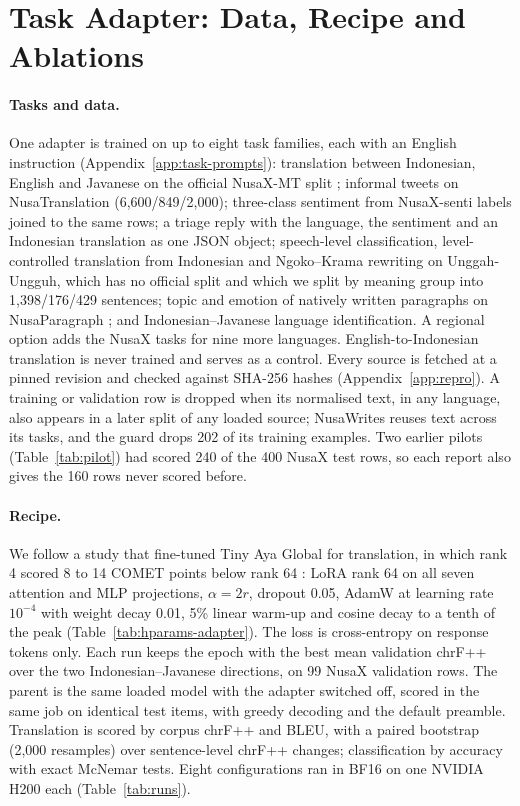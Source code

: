 \documentclass[11pt]{article}
\begin{document}
\section{Task Adapter: Data, Recipe and Ablations}\label{app:adapter}

\paragraph{Tasks and data.} One adapter is trained on up to eight task families, each with an English
instruction (Appendix~\ref{app:task-prompts}): translation between Indonesian, English and Javanese on the
official NusaX-MT split \citep[500/100/400 rows;][]{winata2023nusax}; informal tweets on NusaTranslation
(6,600/849/2,000); three-class sentiment from NusaX-senti labels joined to the same rows; a triage reply with the
language, the sentiment and an Indonesian translation as one JSON object; speech-level classification,
level-controlled translation from Indonesian and Ngoko--Krama rewriting on Unggah-Ungguh, which has no official
split and which we split by meaning group into 1,398/176/429 sentences; topic and emotion of natively written
paragraphs on NusaParagraph \citep{cahyawijaya2023nusawrites}; and Indonesian--Javanese language identification.
A regional option adds the NusaX tasks for nine more languages. English-to-Indonesian translation is never
trained and serves as a control. Every source is fetched at a pinned revision and checked against SHA-256
hashes (Appendix~\ref{app:repro}). A training or validation row is dropped when its normalised text, in any
language, also appears in a later split of any loaded source; NusaWrites reuses text across its tasks, and the
guard drops 202 of its training examples. Two earlier pilots (Table~\ref{tab:pilot}) had scored 240 of the 400
NusaX test rows, so each report also gives the 160 rows never scored before.

\paragraph{Recipe.} We follow a study that fine-tuned Tiny Aya Global for translation, in which rank 4 scored 8
to 14 COMET points below rank 64 \citep{abdulmumin2026afriscience}: LoRA rank 64 on all seven attention and MLP
projections, $\alpha = 2r$, dropout 0.05, AdamW at learning rate $10^{-4}$ with weight decay 0.01, 5\% linear
warm-up and cosine decay to a tenth of the peak (Table~\ref{tab:hparams-adapter}). The loss is cross-entropy on
response tokens only. Each run keeps the epoch with the best mean validation chrF++ over the two
Indonesian--Javanese directions, on 99 NusaX validation rows. The parent is the same loaded model with the
adapter switched off, scored in the same job on identical test items, with greedy decoding and the default
preamble. Translation is scored by corpus chrF++ and BLEU, with a paired bootstrap (2,000 resamples) over
sentence-level chrF++ changes; classification by accuracy with exact McNemar tests. Eight configurations ran in
BF16 on one NVIDIA H200 each (Table~\ref{tab:runs}).
\end{document}
